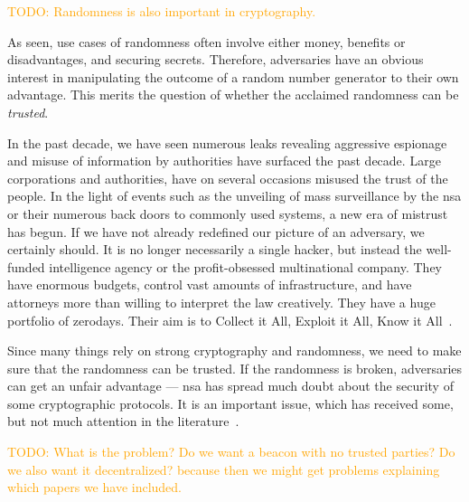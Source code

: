 \textcolor{orange}{TODO: Randomness is also important in cryptography.}

As seen, use cases of randomness often involve either money, benefits or disadvantages, and securing secrets. Therefore, adversaries have an obvious interest in manipulating the outcome of a random number generator to their own advantage.
This merits the question of whether the acclaimed randomness can be \emph{trusted}.

In the past decade, we have seen numerous leaks revealing aggressive espionage and misuse of information by authorities have surfaced the past decade.
Large corporations and authorities, have on several occasions misused the trust of the people.
In the light of events such as the unveiling of mass surveillance by the \gls{nsa} or their numerous back doors to commonly used systems, a new era of mistrust has begun. If we have not already redefined our picture of an adversary, we certainly should. It is no longer necessarily a single hacker, but instead the well-funded intelligence agency or the profit-obsessed multinational company. They have enormous budgets, control vast amounts of infrastructure, and have attorneys more than willing to interpret the law creatively. They have a huge portfolio of zerodays. Their aim is to Collect it All, Exploit it All, Know it All~\cite{rogaway2015moral}.


Since many things rely on strong cryptography and randomness, we need to make sure that the randomness can be trusted. If the randomness is broken, adversaries can get an unfair advantage --- \gls{nsa} has spread much doubt about the security of some cryptographic protocols. It is an important issue, which has received some, but not much attention in the literature~\cite{lenstra2015random}.

\textcolor{orange}{TODO: What is the problem? Do we want a beacon with no trusted parties? Do we also want it decentralized? because then we might get problems explaining which papers we have included.}

